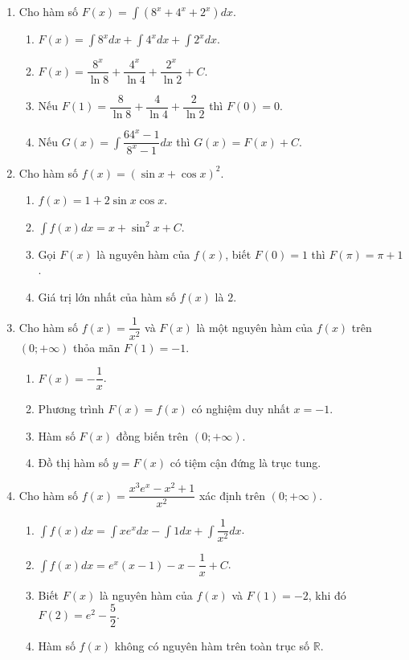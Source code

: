 \documentclass[12pt]{article}
\begin{document}
\begin{enumerate}[label=\textbf{Câu \arabic*.}, start=1]
		\item Cho hàm số $F(x) = \displaystyle \int (8^x + 4^x + 2^x) dx$.
		\begin{enumerate}[label=\alph*)]
			\item $\displaystyle F(x) = \int 8^x dx + \int 4^x dx + \int 2^x dx$.
			\item $F(x) = \dfrac{8^x}{\ln 8} + \dfrac{4^x}{\ln 4} + \dfrac{2^x}{\ln 2} + C$.
			\item Nếu $F(1) = \dfrac{8}{\ln 8} + \dfrac{4}{\ln 4} + \dfrac{2}{\ln 2}$ thì $F(0) = 0$.
			\item Nếu $G(x) = \displaystyle \int \dfrac{64^x - 1}{8^x - 1} dx$ thì $G(x) = F(x) + C$.
		\end{enumerate}
		
		\item Cho hàm số $f(x) = (\sin x + \cos x)^2$.
		\begin{enumerate}[label=\alph*)]
			\item $f(x) = 1 + 2\sin x \cos x$.
			\item $\displaystyle \int f(x) dx = x + \sin^2 x + C$.
			\item Gọi $F(x)$ là nguyên hàm của $f(x)$, biết $F(0) = 1$ thì $F(\pi) = \pi + 1$.
			\item Giá trị lớn nhất của hàm số $f(x)$ là $2$.
		\end{enumerate}
		
		\item Cho hàm số $f(x) = \dfrac{1}{x^2}$ và $F(x)$ là một nguyên hàm của $f(x)$ trên $(0; +\infty)$ thỏa mãn $F(1) = -1$.
		\begin{enumerate}[label=\alph*)]
			\item $F(x) = -\dfrac{1}{x}$.
			\item Phương trình $F(x) = f(x)$ có nghiệm duy nhất $x = -1$.
			\item Hàm số $F(x)$ đồng biến trên $(0; +\infty)$.
			\item Đồ thị hàm số $y = F(x)$ có tiệm cận đứng là trục tung.
		\end{enumerate}
		
		\item Cho hàm số $f(x) = \dfrac{x^3 e^x - x^2 + 1}{x^2}$ xác định trên $(0; +\infty)$.
		\begin{enumerate}[label=\alph*)]
			\item $\displaystyle \int f(x) dx = \int x e^x dx - \int 1 dx + \int \dfrac{1}{x^2} dx$.
			\item $\displaystyle \int f(x) dx = e^x(x - 1) - x - \dfrac{1}{x} + C$.
			\item Biết $F(x)$ là nguyên hàm của $f(x)$ và $F(1) = -2$, khi đó $F(2) = e^2 - \dfrac{5}{2}$.
			\item Hàm số $f(x)$ không có nguyên hàm trên toàn trục số $\mathbb{R}$.
		\end{enumerate}
		

\end{enumerate}
\end{document}
